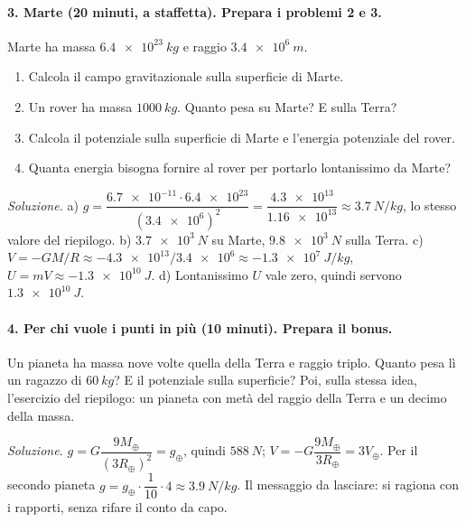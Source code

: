 \documentclass[11pt]{report}
\begin{document}
\paragraph{3. Marte (20 minuti, a staffetta). Prepara i problemi 2 e 3.}
Marte ha massa $\SI{6.4e23}{kg}$ e raggio $\SI{3.4e6}{m}$.
\begin{enumerate}[label=\alph*)]
  \item Calcola il campo gravitazionale sulla superficie di Marte.
  \item Un rover ha massa $\SI{1000}{kg}$. Quanto pesa su Marte? E sulla
  Terra?
  \item Calcola il potenziale sulla superficie di Marte e l'energia
  potenziale del rover.
  \item Quanta energia bisogna fornire al rover per portarlo lontanissimo da
  Marte?
\end{enumerate}

\emph{Soluzione.} a) $g = \dfrac{\num{6.7e-11} \cdot
\num{6.4e23}}{(\num{3.4e6})^2} = \dfrac{\num{4.3e13}}{\num{1.16e13}}
\approx \SI{3.7}{N/kg}$, lo stesso valore del riepilogo. b)
$\SI{3.7e3}{N}$ su Marte, $\SI{9.8e3}{N}$ sulla Terra. c) $V = -GM/R
\approx -\num{4.3e13}/\num{3.4e6} \approx \SI{-1.3e7}{J/kg}$, $U = mV
\approx \SI{-1.3e10}{J}$. d) Lontanissimo $U$ vale zero, quindi servono
$\SI{1.3e10}{J}$.

\paragraph{4. Per chi vuole i punti in più (10 minuti). Prepara il bonus.}
Un pianeta ha massa nove volte quella della Terra e raggio triplo. Quanto
pesa lì un ragazzo di $\SI{60}{kg}$? E il potenziale sulla superficie?
Poi, sulla stessa idea, l'esercizio del riepilogo: un pianeta con metà del
raggio della Terra e un decimo della massa.

\emph{Soluzione.} $g = G\dfrac{9M_\oplus}{(3R_\oplus)^2} = g_\oplus$,
quindi $\SI{588}{N}$; $V = -G\dfrac{9M_\oplus}{3R_\oplus} = 3V_\oplus$.
Per il secondo pianeta $g = g_\oplus \cdot \dfrac{1}{10} \cdot 4 \approx
\SI{3.9}{N/kg}$. Il messaggio da lasciare: si ragiona con i rapporti, senza
rifare il conto da capo.
\end{document}
